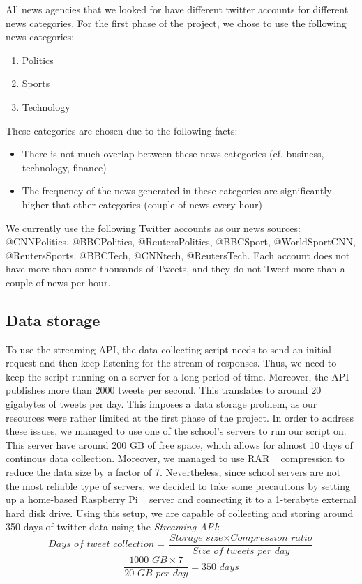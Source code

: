 \documentclass{llncs}
\begin{document}
All news agencies that we looked for have different twitter accounts for different news categories. For the first phase of the project, we chose to use the following news categories:

\begin{enumerate}
  \item Politics
  \item Sports
  \item Technology
\end{enumerate}

These categories are chosen due to the following facts:
\begin{itemize}
  \item There is not much overlap between these news categories (cf. business, technology, finance)
  \item The frequency of the news generated in these categories are significantly higher that other categories (couple of news every hour)
\end{itemize}

We currently use the following Twitter accounts as our news sources: @CNNPolitics, @BBCPolitics, @ReutersPolitics, @BBCSport, @WorldSportCNN, @ReutersSports, @BBCTech, @CNNtech, @ReutersTech. Each account does not have more than some thousands of Tweets, and they do not Tweet more than a couple of news per hour.

\subsection{Data storage}
To use the streaming API, the data collecting script needs to send an initial request and then keep listening for the stream of responses. Thus, we need to keep the script running on a server for a long period of time. Moreover, the API publishes more than 2000 tweets per second. This translates to around 20 gigabytes of tweets per day. This imposes a data storage problem, as our resources were rather limited at the first phase of the project. In order to address these issues, we managed to use one of the school's servers to run our script on. This server have around 200 GB of free space, which allows for almost 10 days of continous data collection. Moreover, we managed to use RAR ~\cite{wiki:RAR} compression to reduce the data size by a factor of 7. Nevertheless, since school servers are not the most reliable type of servers, we decided to take some precautions by setting up a home-based Raspberry Pi ~\cite{wiki:raspberrypi} server and connecting it to a 1-terabyte external hard disk drive. Using this setup, we are capable of collecting and storing around 350 days of twitter data using the \textit{Streaming API}:
\[\textit{Days of tweet collection}=\frac{\textit{Storage size}\times \textit{Compression ratio}} {\textit{Size of tweets per day}}\]
\[\frac{\textit{1000 GB} \times 7}{\textit{20 GB per day}}=\textit{350 days} \]
\end{document}
